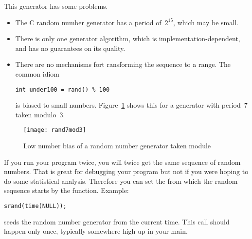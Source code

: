 This generator has some problems.

\begin{itemize}
\item The C random number generator has a period of~$2^{15}$, which may be small.
\item There is only one generator algorithm, which is implementation-dependent,
  and has no guarantees on its quality.
\item There are no mechanisms fort ransforming the sequence to a range.
  The common idiom
\begin{lstlisting}
int under100 = rand() % 100
\end{lstlisting}
is biased to small numbers. Figure~\ref{fig:rand7mod3} shows this
for a generator with period~7 taken modulo~3.
\end{itemize}

\begin{figure}[t]
  \texttt{[image: rand7mod3]}
  \caption{Low number bias of a random number generator taken module}
  \label{fig:rand7mod3}
\end{figure}

If you run your program twice, you will twice get the same sequence of
random numbers. That is great for debugging your program but not if
you were hoping to do some statistical analysis. Therefore you can set
the  from which the random sequence
starts by the  function. Example:
\begin{lstlisting}
srand(time(NULL));
\end{lstlisting}
seeds the random number generator from the current time.
This call should happen only once, typically somewhere high up in your main.

